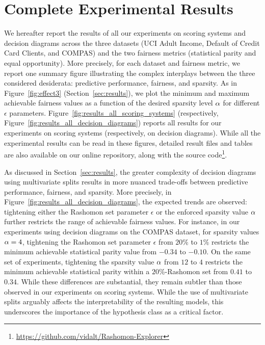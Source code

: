 \newpage 

\section{Complete Experimental Results}
\label{appendix:complete_results}

We hereafter report the results of all our experiments on scoring systems and decision diagrams across the three datasets (UCI Adult Income, Default of Credit Card Clients, and COMPAS) and the two fairness metrics (statistical parity and equal opportunity).
More precisely, for each dataset and fairness metric, we report one summary figure illustrating the complex interplays between the three considered desiderata: predictive performance, fairness, and sparsity. As in Figure~\ref{fig:effect3} (Section~\ref{sec:results}), we plot the minimum and maximum achievable fairness values as a function of the desired sparsity level $\alpha$ for different $\epsilon$ parameters. Figure~\ref{fig:results_all_scoring_systems} (respectively, Figure~\ref{fig:results_all_decision_diagrams}) reports all results for our experiments on scoring systems (respectively, on decision diagrams).
While all the experimental results can be read in these figures, detailed result files and tables are also available on our online repository, along with the source code\footnote{\url{https://github.com/vidalt/Rashomon-Explorer}}.

As discussed in Section~\ref{sec:results}, the greater complexity of decision diagrams using multivariate splits results in more nuanced trade-offs between predictive performance, fairness, and sparsity. More precisely, in Figure~\ref{fig:results_all_decision_diagrams}, the expected trends are observed: tightening either the Rashomon set parameter $\epsilon$ or the enforced sparsity value $\alpha$ further restricts the range of achievable fairness values. 
For instance, in our experiments using decision diagrams on the COMPAS dataset, for sparsity values $\alpha=4$, tightening the Rashomon set parameter $\epsilon$ from $20\%$ to $1\%$ restricts the minimum achievable statistical parity value from $-0.34$ to $-0.10$. On the same set of experiments, tightening the sparsity value $\alpha$ from $12$ to $4$ restricts the minimum achievable statistical parity within a $20\%$-Rashomon set from $0.41$ to $0.34$.
While these differences are substantial, they remain subtler than those observed in our experiments on scoring systems. While the use of multivariate splits arguably affects the interpretability of the resulting models, this underscores the importance of the hypothesis class as a critical factor.


